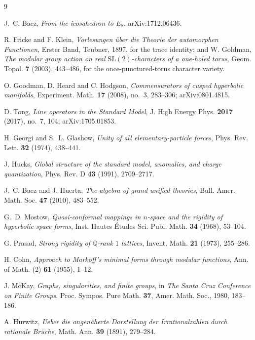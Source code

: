 \documentclass[11pt,reqno]{amsart}
\theoremstyle{plain}
\theoremstyle{definition}
\theoremstyle{remark}
\newcommand{\Q}{\mathbb{Q}}
\newcommand{\SL}{\mathrm{SL}}
\begin{document}
\begin{thebibliography}{9}

 J.~C. Baez, \emph{From the icosahedron to $E_8$}, arXiv:1712.06436.

 R. Fricke and F. Klein, \emph{Vorlesungen \"uber die Theorie der
automorphen Functionen}, Erster Band, Teubner, 1897, for the trace identity; and
W. Goldman, \emph{The modular group action on real $\SL(2)$-characters of a one-holed
torus}, Geom. Topol. \textbf{7} (2003), 443--486, for the once-punctured-torus character
variety.

 O. Goodman, D. Heard and C. Hodgson, \emph{Commensurators of cusped
  hyperbolic manifolds}, Experiment. Math. \textbf{17} (2008), no.~3, 283--306;
  arXiv:0801.4815.

 D. Tong, \emph{Line operators in the Standard Model}, J. High Energy
  Phys. \textbf{2017} (2017), no.~7, 104; arXiv:1705.01853.

 H. Georgi and S.~L. Glashow, \emph{Unity of all
  elementary-particle forces}, Phys. Rev. Lett. \textbf{32} (1974), 438--441.

 J. Hucks, \emph{Global structure of the standard model, anomalies, and
  charge quantization}, Phys. Rev. D \textbf{43} (1991), 2709--2717.

 J.~C. Baez and J. Huerta, \emph{The algebra of grand unified
  theories}, Bull. Amer. Math. Soc. \textbf{47} (2010), 483--552.

 G.~D. Mostow, \emph{Quasi-conformal mappings in $n$-space and the
  rigidity of hyperbolic space forms}, Inst. Hautes \'Etudes Sci. Publ. Math.
  \textbf{34} (1968), 53--104.

 G. Prasad, \emph{Strong rigidity of $\Q$-rank $1$ lattices},
  Invent. Math. \textbf{21} (1973), 255--286.

 H. Cohn, \emph{Approach to Markoff's minimal forms through modular
  functions}, Ann. of Math. (2) \textbf{61} (1955), 1--12.

 J. McKay, \emph{Graphs, singularities, and finite groups}, in
  \emph{The Santa Cruz Conference on Finite Groups}, Proc. Sympos. Pure Math.
  \textbf{37}, Amer. Math. Soc., 1980, 183--186.

 A. Hurwitz, \emph{Ueber die angen\"aherte Darstellung der
  Irrationalzahlen durch rationale Br\"uche}, Math. Ann. \textbf{39} (1891), 279--284.


\end{thebibliography}
\end{document}

